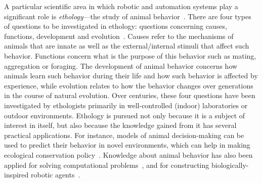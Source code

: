  
A particular scientific area in which robotic and automation systems play a significant role is \textit{ethology}---the study of animal behavior~\cite{Bolhuis_2004}. There are four types of questions to be investigated in ethology: questions concerning causes, functions, development and evolution~\cite{Bolhuis_2004}. Causes refer to the mechanisms of animals that are innate as well as the external/internal stimuli that affect such behavior. Functions concern what is the purpose of this behavior such as mating, aggregation or foraging. The development of animal behavior concerns how animals learn such behavior during their life and how such behavior is affected by experience, while evolution relates to how the behavior changes over generations in the course of natural evolution. Over centuries, these four questions have been investigated by ethologists primarily in well-controlled (indoor) laboratories or outdoor environments. Ethology is pursued not only because it is a subject of interest in itself, but also because the knowledge gained from it has several practical applications. For instance, models of animal decision-making can be used to predict their behavior in novel environments, which can help in making ecological conservation policy~\cite{Sutherland1998}. Knowledge about animal behavior has also been applied for solving computational problems~\citep{Floreano2008}, and for constructing biologically-inspired robotic agents~\citep{Meyer2008}. 

